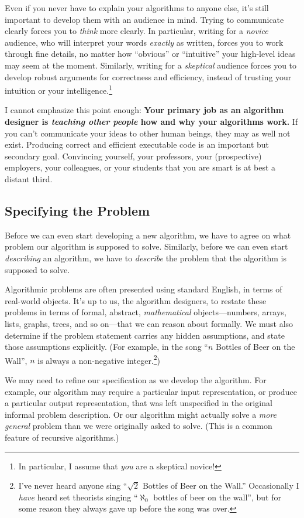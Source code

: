 Even if you never have to explain your algorithms to anyone else, it’s still important to develop them with an audience in mind. Trying to communicate clearly forces you to \textit{think} more clearly. In particular, writing for a \textit{novice} audience, who will interpret your words \textit{exactly} as written, forces you to work through fine details, no matter how “obvious” or “intuitive” your high-level ideas may seem at the moment. Similarly, writing for a \textit{skeptical} audience forces you to develop robust arguments for correctness and efficiency, instead of trusting your intuition or your intelligence.\footnote{In particular, I assume that \textit{you} are a skeptical novice!}

I cannot emphasize this point enough: \textbf{Your primary job as an algorithm designer is \textit{teaching other people} how and why your algorithms work.} If you can’t communicate your ideas to other human beings, they may as well not exist. Producing correct and efficient executable code is an important but secondary goal. Convincing yourself, your professors, your (prospective) employers, your colleagues, or your students that you are smart is at best a distant third.

\subsection{Specifying the Problem}
Before we can even start developing a new algorithm, we have to agree on what problem our algorithm is supposed to solve. Similarly, before we can even start \textit{describing} an algorithm, we have to \textit{describe} the problem that the algorithm is supposed to solve.

Algorithmic problems are often presented using standard English, in terms of real-world objects. It’s up to us, the algorithm designers, to restate these problems in terms of formal, abstract, \textit{mathematical} objects—numbers, arrays, lists, graphs, trees, and so on—that we can reason about formally. We must also determine if the problem statement carries any hidden assumptions, and state those assumptions explicitly. (For example, in the song “$n$ Bottles of Beer on the Wall”, $n$ is always a non-negative integer.\footnote{I’ve never heard anyone sing “$\sqrt{2}$ Bottles of Beer on the Wall.” Occasionally I \textit{have} heard set theorists singing “$\aleph_0$ bottles of beer on the wall”, but for some reason they always gave up before the song was over.})

We may need to refine our specification as we develop the algorithm. For example, our algorithm may require a particular input representation, or produce a particular output representation, that was left unspecified in the original informal problem description. Or our algorithm might actually solve a \textit{more general} problem than we were originally asked to solve. (This is a common feature of recursive algorithms.)

